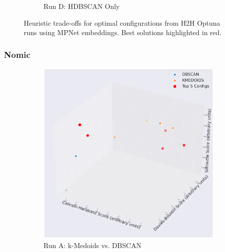 \documentclass[10pt,oneside]{report}
\begin{document}
\begin{figure}[H]
\begin{subfigure}[b]{0.48\textwidth}
        \caption{Run D: HDBSCAN Only}
        \label{fig:mpnet_hdbscan_only_h2h_config}
    \end{subfigure}
    \caption{Heuristic trade-offs for optimal configurations from H2H Optuna runs using MPNet embeddings. Best solutions highlighted in red.}
    \label{fig:mpnet_h2h_config_appendix}
\end{figure}

\subsubsection{Nomic}

\begin{figure}[H]
    \centering
    \begin{subfigure}[b]{0.48\textwidth}
        \centering
        \includegraphics[width=\textwidth]{./images/nomic_kmedoidsvsdbscan.png}
        \caption{Run A: k-Medoids vs. DBSCAN}
        \label{fig:nomic_kmedoids_vs_dbscan_h2h_config} 
    \end{subfigure}
    \hfill
    \begin{subfigure}[b]{0.48\textwidth}
        \centering

\end{subfigure}
\end{figure}
\end{document}
